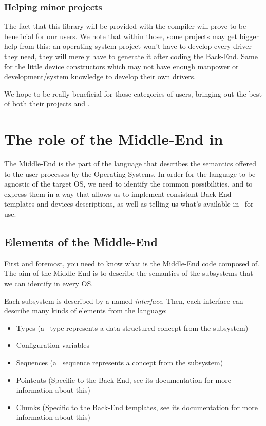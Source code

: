 \documentclass[american]{rtxreport}
\begin{document}
\subsection{Helping minor projects}

The fact that this library will be provided with the compiler will prove
to be beneficial for our users. We note that within those, some projects
may get bigger help from this: an operating system project won't have to
develop every driver they need, they will merely have to generate it after
coding the Back-End. Same for the little device constructors which may not
have enough manpower or development/system knowledge to develop their own
drivers.

We hope to be really beneficial for those categories of users, bringing out
the best of both their projects and \rtx.



\chapter{The role of the Middle-End in \rtx}

The Middle-End is the part of the language that describes the semantics offered
to the user processes by the Operating Systems. In order for the language to be
agnostic of the target OS, we need to identify the common possibilities, and to
express them in a way that allows us to implement consistant Back-End templates
and devices descriptions, as well as telling us what's available in \rtx\ for
use.

\section{Elements of the Middle-End}

First and foremost, you need to know what is the Middle-End code composed of.
The aim of the Middle-End is to describe the semantics of the subsystems that
we can identify in every OS.

Each subsystem is described by a named \emph{interface}. Then, each interface
can describe many kinds of elements from the language:
\begin{itemize}
    \item Types (a \rtx\ type represents a data-structured concept from the
                 subsystem)
    \item Configuration variables
    \item Sequences (a \rtx\ sequence represents a concept from the subsystem)
    \item Pointcuts (Specific to the Back-End, see its documentation
                     for more information about this)
    \item Chunks (Specific to the Back-End templates, see its documentation for
                  more information about this)
\end{itemize}
\end{document}
